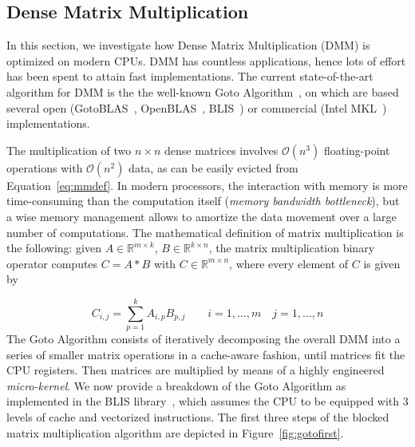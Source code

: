 \subsection{Dense Matrix Multiplication}
\label{subsec:dmm}
In this section, we investigate how Dense Matrix Multiplication (DMM) is optimized on modern CPUs. DMM has countless applications, hence lots of effort has been spent to attain fast implementations. The current state-of-the-art algorithm for DMM is the the well-known Goto Algorithm~\cite{goto2008anatomy}, on which are based several open (GotoBLAS~\cite{goto2008anatomy}, OpenBLAS~\cite{xianyi2012openblas}, BLIS~\cite{huang2016blislab}) or commercial (Intel MKL~\cite{wang2014intel}) implementations.

The multiplication of two $ n \times n$ dense matrices involves $\mathcal{O}(n^3)$ floating-point operations with $\mathcal{O}(n^2)$ data, as can be easily evicted from Equation~\ref{eq:mmdef}. In modern processors, the interaction with memory is more time-consuming than the  computation itself (\textit{memory bandwidth bottleneck}), but a wise memory management allows to amortize the data movement over a large number of computations.
The mathematical definition of matrix multiplication is the following: given  $A \in \mathbb{R}^{m \times k}$, $B \in \mathbb{R}^{k \times n}$, the matrix multiplication binary operator computes $C = A*B$  with $C \in \mathbb{R}^{m \times n}$, where every element of $C$ is given by

\begin{equation} \label{eq:mmdef} 
C_{i,j} = \sum_{p=1}^{k} A_{i, p}  B_{p,j} \qquad  i=1, \dots, m \quad j=1, \dots, n 
\end{equation}
The Goto Algorithm consists of iteratively decomposing the overall DMM into a series of smaller matrix operations in a cache-aware fashion, until matrices fit the CPU registers. Then matrices are multiplied by means of a highly engineered \textit{micro-kernel}. We now provide a breakdown of the Goto Algorithm as implemented in the BLIS library~\cite{lawson1979basic,van2015blis}, which assumes the CPU to be equipped with 3 levels of cache and vectorized instructions. The first three steps of the blocked matrix multiplication algorithm are depicted in Figure~\ref{fig:gotofirst}.


